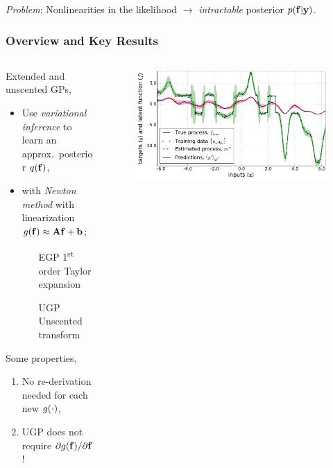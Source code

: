 \documentclass{beamer}
\begin{document}
\begin{frame}
\begin{columns}
\begin{column}{0.5\linewidth}
\end{column}
\end{columns}

\emph{Problem}: Nonlinearities in the likelihood $\rightarrow$ 
\emph{intractable} posterior $p\!\left({\mathbf{f}}\middle\vert{\ensuremath{\mathbf{y}}}\right)$.
\vspace{3mm}


\end{frame}



\begin{frame}
    \frametitle{Overview and Key Results}


\vspace{-7mm}
\begin{columns}

\begin{column}{0.45\linewidth}

Extended and unscented GPs,
\begin{itemize}
    \footnotesize
    \item Use \emph{variational inference} to learn an approx.\ posterior 
        $q\!\left({\mathbf{f}}\right)$,
    \item with \emph{Newton method} with linearization
        $g\!\left({{\mathbf{f}}}\right) \approx \mathbf{A}\mathbf{f} + \mathbf{b}$;
    \begin{itemize}
        \footnotesize
        \item[EGP] 1\textsuperscript{st} order Taylor expansion
        \item[UGP] Unscented transform
    \end{itemize}
\end{itemize}

\vspace{2mm}
Some properties,
\begin{enumerate}
    \footnotesize
    \item No re-derivation needed for each new $g\!\left({{\cdot}}\right)$,
    \item UGP does not require $\partial g\!\left({{\mathbf{f}}}\right)\!/\partial{\ensuremath{\mathbf{f}}}$!
\end{enumerate}

\end{column}

\begin{column}{0.55\linewidth}

\begin{figure}
    \includegraphics[width=0.75\linewidth]{fig/signdemo}


\end{figure}
\end{column}
\end{columns}
\end{frame}
\end{document}
